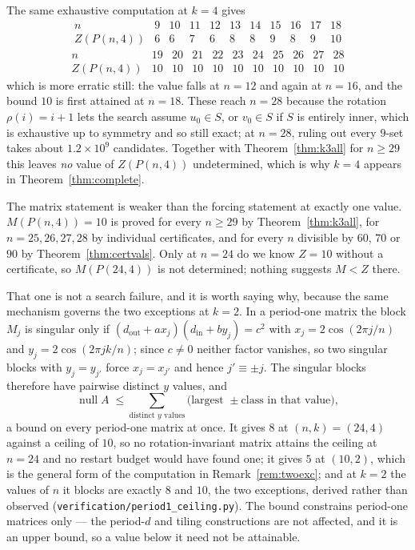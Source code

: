\documentclass[11pt]{article}
\theoremstyle{definition}
\begin{document}
\noindent
The same exhaustive computation at $k=4$ gives
\[
\begin{array}{r|cccccccccc}
 n & 9 & 10 & 11 & 12 & 13 & 14 & 15 & 16 & 17 & 18\\ \hline
 Z(P(n,4)) & 6 & 6 & 7 & 6 & 8 & 8 & 9 & 8 & 9 & 10
\end{array}
\]
\[
\begin{array}{r|cccccccccc}
 n & 19 & 20 & 21 & 22 & 23 & 24 & 25 & 26 & 27 & 28\\ \hline
 Z(P(n,4)) & 10 & 10 & 10 & 10 & 10 & 10 & 10 & 10 & 10 & 10
\end{array}
\]
which is more erratic still: the value falls at $n=12$ and again at $n=16$, and
the bound $10$ is first attained at $n=18$. These reach $n=28$ because the
rotation $\rho(i)=i+1$ lets the search assume $u_0\in S$, or $v_0\in S$ if $S$ is
entirely inner, which is exhaustive up to symmetry and so still exact; at
$n=28$, ruling out every $9$-set takes about $1.2\times10^{9}$ candidates.
Together with Theorem~\ref{thm:k3all} for $n\ge29$ this leaves \emph{no} value
of $Z(P(n,4))$ undetermined, which is why $k=4$ appears in
Theorem~\ref{thm:complete}.

The matrix statement is weaker than the forcing statement at exactly one value.
$M(P(n,4))=10$ is proved for every $n\ge29$ by Theorem~\ref{thm:k3all}, for
$n=25,26,27,28$ by individual certificates, and for every $n$ divisible by $60$,
$70$ or $90$ by Theorem~\ref{thm:certvals}. Only at $n=24$ do we know $Z=10$
without a certificate, so $M(P(24,4))$ is not determined; nothing suggests
$M<Z$ there.

That one is not a search failure, and it is worth saying why, because the same
mechanism governs the two exceptions at $k=2$. In a period-one matrix the block
$M_j$ is singular only if $(d_{\mathrm{out}}+ax_j)(d_{\mathrm{in}}+by_j)=c^2$
with $x_j=2\cos(2\pi j/n)$ and $y_j=2\cos(2\pi jk/n)$; since $c\neq0$ neither
factor vanishes, so two singular blocks with $y_j=y_{j'}$ force
$x_j=x_{j'}$ and hence $j'\equiv\pm j$. The singular blocks therefore have
pairwise distinct $y$ values, and
\[
  \operatorname{null}A\;\le\!\!\sum_{\text{distinct } y\text{ values}}\!\!
  \bigl(\text{largest } \pm\text{class in that value}\bigr),
\]
a bound on every period-one matrix at once. It gives $8$ at $(n,k)=(24,4)$
against a ceiling of $10$, so no rotation-invariant matrix attains the ceiling
at $n=24$ and no restart budget would have found one; it gives $5$ at
$(10,2)$, which is the general form of the computation in
Remark~\ref{rem:twoexc}; and at $k=2$ the values of $n$ it blocks are exactly
$8$ and $10$, the two exceptions, derived rather than observed
(\texttt{verification/period1\_ceiling.py}). The bound constrains period-one
matrices only --- the period-$d$ and tiling constructions are not affected, and
it is an upper bound, so a value below it need not be attainable.
\end{document}
